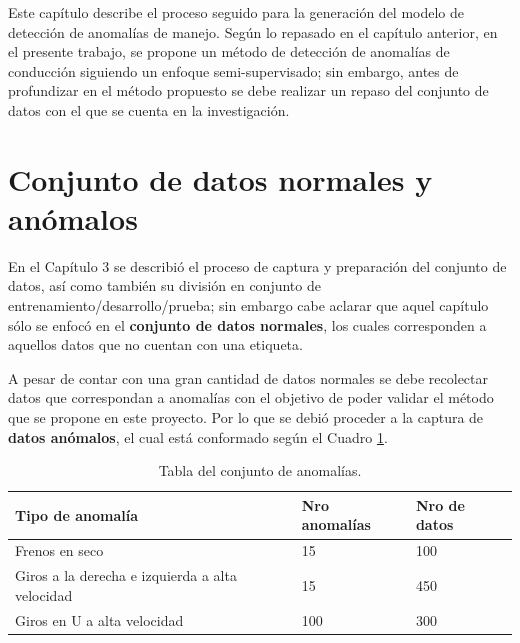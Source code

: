 Este cap\'{i}tulo describe el proceso seguido para la generaci\'{o}n del modelo de detecci\'{o}n de anomal\'{i}as de manejo. Seg\'{u}n lo repasado en el cap\'{i}tulo anterior, en el presente trabajo, se propone un m\'{e}todo de detecci\'{o}n de anomal\'{i}as de conducci\'{o}n siguiendo un enfoque semi-supervisado; sin embargo, antes de profundizar en el m\'{e}todo propuesto se debe realizar un repaso del conjunto de datos con el que se cuenta en la investigaci\'{o}n.

\section{Conjunto de datos normales y an\'{o}malos}

En el Cap\'{i}tulo 3 se describi\'{o} el proceso de captura y preparaci\'{o}n del conjunto de datos, as\'{i} como tambi\'{e}n su divisi\'{o}n en conjunto de entrenamiento/desarrollo/prueba; sin embargo cabe aclarar que aquel cap\'{i}tulo s\'{o}lo se enfoc\'{o} en el  \textbf{conjunto de datos normales}, los cuales corresponden a aquellos datos que no cuentan con una etiqueta.%

\vspace{5mm} %

A pesar de contar con una gran cantidad de datos normales se debe recolectar datos que correspondan a anomal\'{i}as con el objetivo de poder validar el m\'{e}todo que se propone en este proyecto. Por lo que se debi\'{o} proceder a la captura de  \textbf{datos an\'{o}malos}, el cual est\'{a} conformado seg\'{u}n el Cuadro \ref{table:conjunto_anomalias}.

\begin{table}[]
\centering
\begin{tabular}{|l|l|l|}
\hline
Tipo de anomal\'{i}a & Nro anomal\'{i}as & Nro de datos \\ \hline
Frenos en seco    & 15  & 100  \\ \hline
Giros a la derecha e izquierda a alta velocidad & 15  & 450  \\ \hline
Giros en U a alta velocidad & 100 & 300 \\ \hline
\end{tabular}
\caption{Tabla del conjunto de anomal\'{i}as.}
\label{table:conjunto_anomalias}
\end{table}

\vspace{5mm} %

